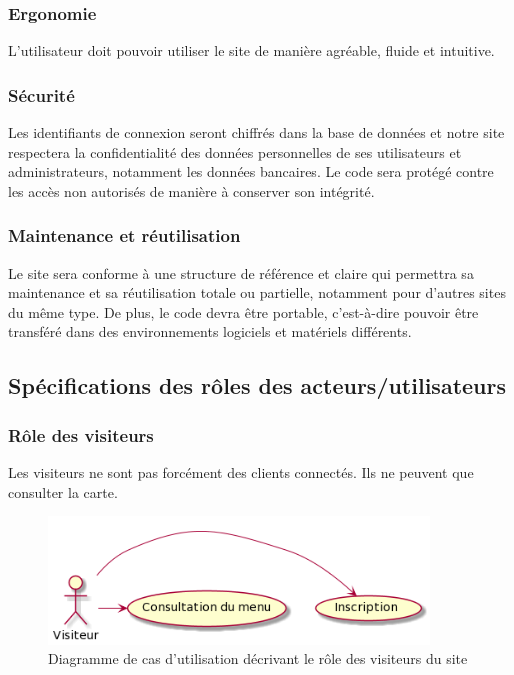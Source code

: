 \subsubsection{Ergonomie}
L’utilisateur doit pouvoir utiliser le site de manière agréable, fluide et intuitive.

\subsubsection{Sécurité}
Les identifiants de connexion seront chiffrés dans la base de données et notre site respectera la confidentialité des données personnelles de ses utilisateurs et administrateurs, notamment les données bancaires. Le code sera protégé contre les accès non autorisés de manière à conserver son intégrité.

\subsubsection{Maintenance et réutilisation}
Le site sera conforme à une structure de référence et claire qui permettra sa maintenance et sa réutilisation totale ou partielle, notamment pour d'autres sites du même type. De plus, le code devra être portable, c'est-à-dire pouvoir être transféré dans des environnements logiciels et matériels différents.

\clearpage

\subsection{Spécifications des rôles des acteurs/utilisateurs}

\subsubsection{Rôle des visiteurs}
Les visiteurs ne sont pas forcément des clients connectés. Ils ne peuvent que consulter la carte.

\begin{figure}[H]
\begin{centering}
\includegraphics[width=0.9\textwidth,height=0.3\textheight]{Ressources/Visiteur.png}
\caption{Diagramme de cas d'utilisation décrivant le rôle des visiteurs du site}
\par
\end{centering}
\end{figure}


